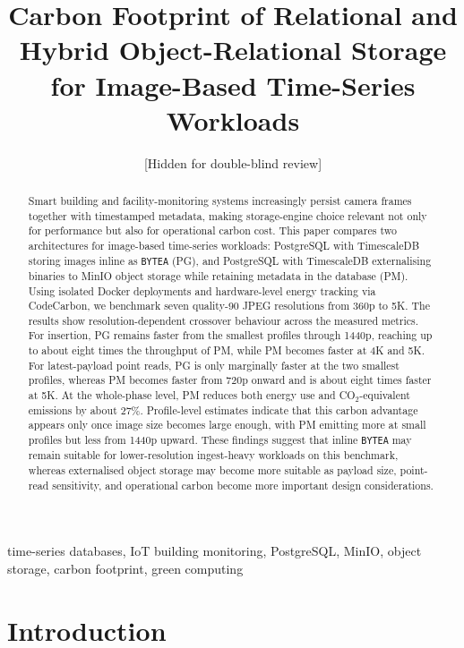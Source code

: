 \documentclass[conference]{IEEEtran}
\begin{document}
\title{Carbon Footprint of Relational and Hybrid Object-Relational Storage for Image-Based Time-Series Workloads}

\author{
[Hidden for double-blind review]
}


\maketitle

\begin{abstract}
Smart building and facility-monitoring systems increasingly persist camera frames together with timestamped metadata, making storage-engine choice relevant not only for performance but also for operational carbon cost. This paper compares two architectures for image-based time-series workloads: PostgreSQL with TimescaleDB storing images inline as \texttt{BYTEA} (PG), and PostgreSQL with TimescaleDB externalising binaries to MinIO object storage while retaining metadata in the database (PM). Using isolated Docker deployments and hardware-level energy tracking via CodeCarbon, we benchmark seven quality-90 JPEG resolutions from 360p to 5K. The results show resolution-dependent crossover behaviour across the measured metrics. For insertion, PG remains faster from the smallest profiles through 1440p, reaching up to about eight times the throughput of PM, while PM becomes faster at 4K and 5K. For latest-payload point reads, PG is only marginally faster at the two smallest profiles, whereas PM becomes faster from 720p onward and is about eight times faster at 5K. At the whole-phase level, PM reduces both energy use and CO$_2$-equivalent emissions by about 27\%. Profile-level estimates indicate that this carbon advantage appears only once image size becomes large enough, with PM emitting more at small profiles but less from 1440p upward. These findings suggest that inline \texttt{BYTEA} may remain suitable for lower-resolution ingest-heavy workloads on this benchmark, whereas externalised object storage may become more suitable as payload size, point-read sensitivity, and operational carbon become more important design considerations.
\end{abstract}

\begin{IEEEkeywords}
time-series databases, IoT building monitoring, PostgreSQL, MinIO, object storage, carbon footprint, green computing
\end{IEEEkeywords}

\section{Introduction}
\label{sec:introduction}
\end{document}
